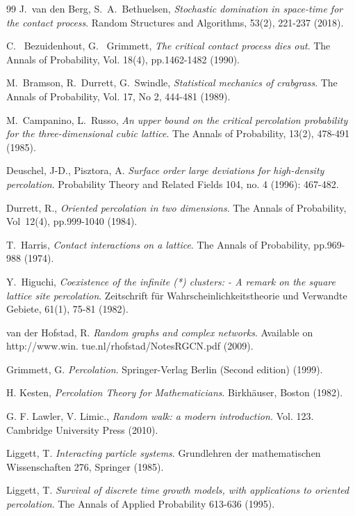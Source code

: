 \documentclass[a4paper,12pt]{article}
\begin{document}
{\begin{thebibliography}{99}
J.\ van den Berg, S.\ A.\ Bethuelsen, \textit{Stochastic domination in space-time for the contact process}. Random Structures and Algorithms, 53(2), 221-237 (2018).


 C. \ Bezuidenhout, G. \ Grimmett, \textit{The critical contact process dies out}. The Annals of Probability, Vol. 18(4), pp.1462-1482 (1990).


M.\ Bramson, R.\ Durrett, G.\ Swindle,
\textit{Statistical mechanics of crabgrass}.
The Annals of Probability, Vol. 17, No 2, 444-481 (1989).

M.\ Campanino, L.\ Russo,
\textit{An upper bound on the critical percolation probability for the three-dimensional cubic lattice}. The Annals of Probability, 13(2), 478-491 (1985).

 Deuschel, J-D.,  Pisztora, A. \textit{Surface order large deviations for high-density percolation}. Probability Theory and Related Fields 104, no. 4 (1996): 467-482.


 Durrett, R., \textit{Oriented percolation in two dimensions}. The Annals of Probability, Vol~12(4), pp.999-1040 (1984).

 T.\ Harris, \textit{Contact interactions on a lattice}. The Annals of Probability, pp.969-988 (1974).

 Y.\ Higuchi, \textit{Coexistence of the infinite (*) clusters: - A remark on the square lattice site percolation}.
 Zeitschrift f\"ur Wahrscheinlichkeitstheorie und Verwandte Gebiete, 61(1), 75-81  (1982).


 van der Hofstad, R. \textit{Random graphs and complex networks}. Available on http://www.win. tue.nl/rhofstad/NotesRGCN.pdf (2009).

 Grimmett, G. \textit{Percolation}. Springer-Verlag Berlin (Second edition) (1999).


H. Kesten,  {\em Percolation Theory for Mathematicians}. Birkh\"auser, Boston (1982).

G. F. Lawler, V. Limic., \textit{Random walk: a modern introduction.} Vol. 123. Cambridge University Press (2010).

 Liggett,  T. \textit{Interacting particle systems}. Grundlehren der mathematischen Wissenschaften 276, Springer (1985).

 Liggett, T. \textit{Survival of discrete time growth models, with applications to oriented percolation}. The Annals of Applied Probability 613-636 (1995).


\end{thebibliography}}
\end{document}

